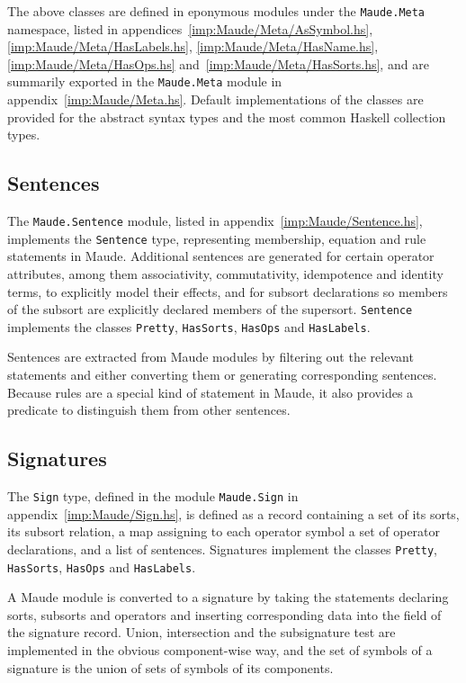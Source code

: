 \documentclass[11pt]{article}
\begin{document}
The above classes are defined in eponymous modules under the \texttt{Maude.Meta} namespace, listed in appendices~\ref{imp:Maude/Meta/AsSymbol.hs}, \ref{imp:Maude/Meta/HasLabels.hs}, \ref{imp:Maude/Meta/HasName.hs}, \ref{imp:Maude/Meta/HasOps.hs} and~\ref{imp:Maude/Meta/HasSorts.hs}, and are summarily exported in the \texttt{Maude.Meta} module in appendix~\ref{imp:Maude/Meta.hs}. Default implementations of the classes are provided for the abstract syntax types and the most common Haskell collection types.


\subsection{Sentences}
\label{sub:implementation_sentences}

The \texttt{Maude.Sentence} module, listed in appendix~\ref{imp:Maude/Sentence.hs}, implements the \texttt{Sentence} type, representing membership, equation and rule statements in Maude. Additional sentences are generated for certain operator attributes, among them associativity, commutativity, idempotence and identity terms, to explicitly model their effects, and for subsort declarations so members of the subsort are explicitly declared members of the supersort. \texttt{Sentence} implements the classes \texttt{Pretty}, \texttt{HasSorts}, \texttt{HasOps} and \texttt{HasLabels}.

Sentences are extracted from Maude modules by filtering out the relevant statements and either converting them or generating corresponding sentences. Because rules are a special kind of statement in Maude, it also provides a predicate to distinguish them from other sentences.


\subsection{Signatures}
\label{sub:implementation_signatures}

The \texttt{Sign} type, defined in the module \texttt{Maude.Sign} in appendix~\ref{imp:Maude/Sign.hs}, is defined as a record containing a set of its sorts, its subsort relation, a map assigning to each operator symbol a set of operator declarations, and a list of sentences. Signatures implement the classes \texttt{Pretty}, \texttt{HasSorts}, \texttt{HasOps} and \texttt{HasLabels}.

A Maude module is converted to a signature by taking the statements declaring sorts, subsorts and operators and inserting corresponding data into the field of the signature record. Union, intersection and the subsignature test are implemented in the obvious component-wise way, and the set of symbols of a signature is the union of sets of symbols of its components.
\end{document}
